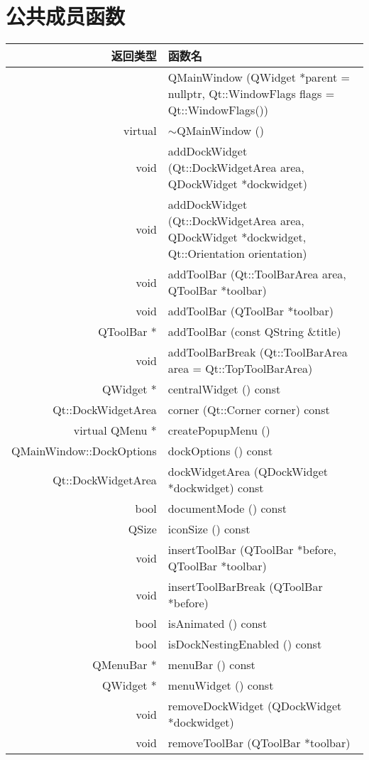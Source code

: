\section{公共成员函数}

\begin{longtable}[l]{|r|m{20em}|}
\hline
返回类型  & 	函数名 \\
\hline
 &QMainWindow (QWidget *parent = nullptr, Qt::WindowFlags flags = Qt::WindowFlags()) \\ 
 \hline
virtual  &	$\sim$QMainWindow () \\
\hline
void 	&addDockWidget (Qt::DockWidgetArea area, QDockWidget *dockwidget) \\ 
\hline
void 	&addDockWidget (Qt::DockWidgetArea area, QDockWidget *dockwidget, Qt::Orientation orientation) \\
\hline
void 	&addToolBar (Qt::ToolBarArea area, QToolBar *toolbar) \\ 
\hline
void 	&addToolBar (QToolBar *toolbar) \\ 
\hline
QToolBar *& 	addToolBar (const QString \&title) \\
\hline
void 	&addToolBarBreak (Qt::ToolBarArea area = Qt::TopToolBarArea) \\
\hline
QWidget *& 	centralWidget () const \\ 
\hline
Qt::DockWidgetArea &	corner (Qt::Corner corner) const \\
\hline
virtual QMenu * &	createPopupMenu () \\
\hline
QMainWindow::DockOptions& 	dockOptions () const\\
\hline
Qt::DockWidgetArea 	&dockWidgetArea (QDockWidget *dockwidget) const\\
\hline
bool &	documentMode () const \\
\hline
QSize &	iconSize () const\\
\hline
void 	&insertToolBar (QToolBar *before, QToolBar *toolbar)\\
\hline
void 	&insertToolBarBreak (QToolBar *before)\\
\hline
bool 	&isAnimated () const\\
\hline
bool 	&isDockNestingEnabled () const\\
\hline
QMenuBar *& 	menuBar () const \\ 
\hline
QWidget * &	menuWidget () const \\ 
\hline
void 	&removeDockWidget (QDockWidget *dockwidget)\\ 
\hline
void 	&removeToolBar (QToolBar *toolbar) \\ 

\end{longtable}
